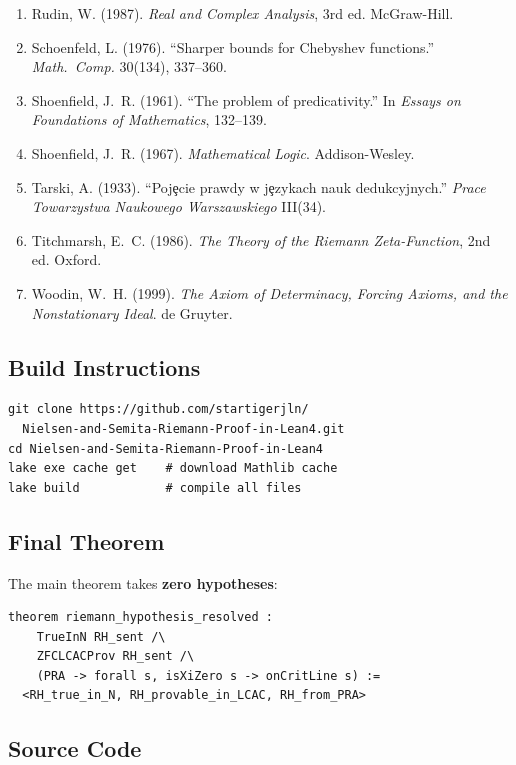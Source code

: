 \begin{enumerate}[leftmargin=*]
\item Rudin, W. (1987). \emph{Real and Complex Analysis}, 3rd ed. McGraw-Hill.
\item Schoenfeld, L. (1976). ``Sharper bounds for Chebyshev functions.'' \emph{Math.\ Comp.} 30(134), 337--360.
\item Shoenfield, J.~R. (1961). ``The problem of predicativity.'' In \emph{Essays on Foundations of Mathematics}, 132--139.
\item Shoenfield, J.~R. (1967). \emph{Mathematical Logic}. Addison-Wesley.
\item Tarski, A. (1933). ``Poj\c{e}cie prawdy w j\c{e}zykach nauk dedukcyjnych.'' \emph{Prace Towarzystwa Naukowego Warszawskiego} III(34).
\item Titchmarsh, E.~C. (1986). \emph{The Theory of the Riemann Zeta-Function}, 2nd ed. Oxford.
\item Woodin, W.~H. (1999). \emph{The Axiom of Determinacy, Forcing Axioms, and the Nonstationary Ideal}. de Gruyter.
\end{enumerate}

\subsection*{Build Instructions}

\begin{verbatim}
git clone https://github.com/startigerjln/
  Nielsen-and-Semita-Riemann-Proof-in-Lean4.git
cd Nielsen-and-Semita-Riemann-Proof-in-Lean4
lake exe cache get    # download Mathlib cache
lake build            # compile all files
\end{verbatim}

\subsection*{Final Theorem}

The main theorem takes \textbf{zero hypotheses}:

\begin{lstlisting}
theorem riemann_hypothesis_resolved :
    TrueInN RH_sent /\
    ZFCLCACProv RH_sent /\
    (PRA -> forall s, isXiZero s -> onCritLine s) :=
  <RH_true_in_N, RH_provable_in_LCAC, RH_from_PRA>
\end{lstlisting}

\subsection*{Source Code}

